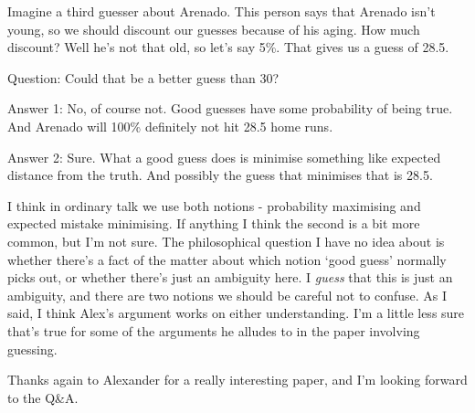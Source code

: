 \documentclass[
  11pt,
  letterpaper,
  DIV=11,
  numbers=noendperiod,
  twoside]{scrartcl}
\begin{document}
Imagine a third guesser about Arenado. This person says that Arenado
isn't young, so we should discount our guesses because of his aging. How
much discount? Well he's not that old, so let's say 5\%. That gives us a
guess of 28.5.

Question: Could that be a better guess than 30?

Answer 1: No, of course not. Good guesses have some probability of being
true. And Arenado will 100\% definitely not hit 28.5 home runs.

Answer 2: Sure. What a good guess does is minimise something like
expected distance from the truth. And possibly the guess that minimises
that is 28.5.

I think in ordinary talk we use both notions - probability maximising
and expected mistake minimising. If anything I think the second is a bit
more common, but I'm not sure. The philosophical question I have no idea
about is whether there's a fact of the matter about which notion `good
guess' normally picks out, or whether there's just an ambiguity here. I
\emph{guess} that this is just an ambiguity, and there are two notions
we should be careful not to confuse. As I said, I think Alex's argument
works on either understanding. I'm a little less sure that's true for
some of the arguments he alludes to in the paper involving guessing.

Thanks again to Alexander for a really interesting paper, and I'm
looking forward to the Q\&A.
\end{document}
